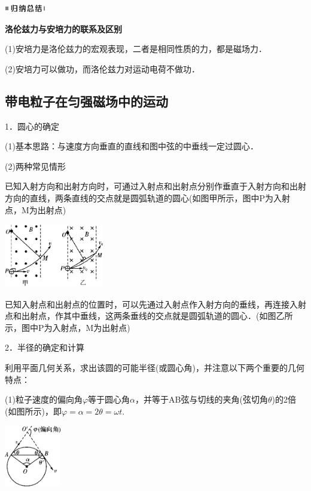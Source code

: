 \begin{center}\includegraphics[width=0.70764in,height=0.12292in]{media/image13.png}\end{center}
\begin{center}
	\textbf{洛伦兹力与安培力的联系及区别}
\end{center}


(1)安培力是洛伦兹力的宏观表现，二者是相同性质的力，都是磁场力．

(2)安培力可以做功，而洛伦兹力对运动电荷不做功．
\newpage
\subsection{带电粒子在匀强磁场中的运动}

1．圆心的确定

(1)基本思路：与速度方向垂直的直线和图中弦的中垂线一定过圆心．

(2)两种常见情形

已知入射方向和出射方向时，可通过入射点和出射点分别作垂直于入射方向和出射方向的直线，两条直线的交点就是圆弧轨道的圆心(如图甲所示，图中P为入射点，M为出射点)

\begin{center}\includegraphics[width=1.70764in,height=1.10347in]{media/image353.png}\end{center}

已知入射点和出射点的位置时，可以先通过入射点作入射方向的垂线，再连接入射点和出射点，作其中垂线，这两条垂线的交点就是圆弧轨道的圆心．(如图乙所示，图中P为入射点，M为出射点)

2．半径的确定和计算

利用平面几何关系，求出该圆的可能半径(或圆心角)，并注意以下两个重要的几何特点：

(1)粒子速度的偏向角$\varphi$等于圆心角$\alpha$，并等于AB弦与切线的夹角(弦切角$\theta$)的2倍(如图所示)，即$\varphi=\alpha=2\theta=\omega t$.

\begin{center}\includegraphics[width=0.97153in,height=1.05694in]{media/image354.png}\end{center}

